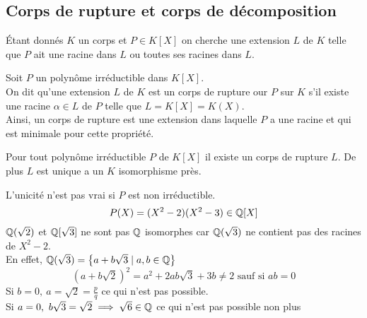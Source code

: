 \subsection{Corps de rupture et corps de décomposition}

Étant donnés $K$ un corps et $P\in K[X]$ on cherche une extension $L$ de $K$ telle que $P$ ait une racine dans $L$ ou toutes ses racines dans $L$.



\begin{definition}
	Soit $P$ un polynôme irréductible dans $K[X]$.\\
	On dit qu'une extension $L$ de $K$ est un corps de rupture our $P$ sur $K$ s'il existe une
	racine $\alpha \in L$ de $P$ telle que $L = K[X] = K(X)$. \\
	Ainsi, un corps de rupture est une extension dans laquelle $P$ a une racine et
	qui est minimale pour cette propriété.
\end{definition}

\begin{theorem}
	Pour tout polynôme irréductible $P$ de $K[X]$ il existe un corps de rupture $L$.
	De plus $L$ est unique a un $K$ isomorphisme près.
\end{theorem}


\begin{remarque}
	L'unicité n'est pas vrai si $P$ est non irréductible.
	$$ P(X) = (X^2 - 2) (X^2 - 3) \in \mathbb{Q}[X]$$
	$\mathbb{Q}(\sqrt{2})$ et $\mathbb{Q}[\sqrt{3}]$ ne sont pas $\mathbb{Q}$ isomorphes car
	$\mathbb{Q}(\sqrt{3})$ ne contient pas des racines de $X^2-2$.\\
	En effet, $\mathbb{Q}(\sqrt{3}) = \left\{  a + b\sqrt{3} \mid a,b \in \mathbb{Q}  \right\}$
	$$ (a + b\sqrt{2}) ^2 = a^2 + 2ab\sqrt{3}  + 3b \neq 2 \text{ sauf si } ab = 0$$
	Si $b=0, \ a = \sqrt{2} = \frac{p}{q}$ ce qui n'est pas possible. \\
	Si $a=0, \ b\sqrt{3} = \sqrt{2} \implies \sqrt{6} \in \mathbb{Q} $ ce qui n'est pas possible non plus
\end{remarque}


